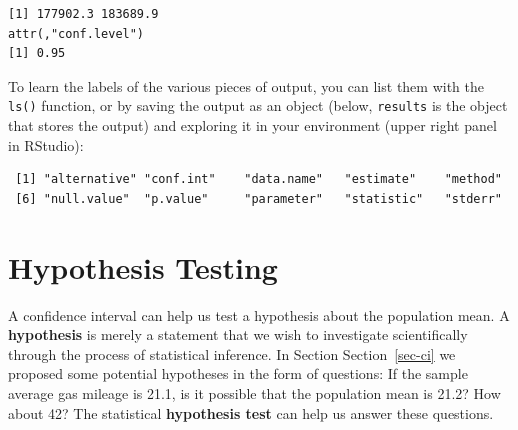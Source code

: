 \documentclass[
  letterpaper,
  DIV=11,
  numbers=noendperiod]{scrreprt}
\newenvironment{Shaded}{\begin{snugshade}}{\end{snugshade}}
\newcommand{\AttributeTok}[1]{\textcolor[rgb]{0.40,0.45,0.13}{#1}}
\newcommand{\FloatTok}[1]{\textcolor[rgb]{0.68,0.00,0.00}{#1}}
\newcommand{\FunctionTok}[1]{\textcolor[rgb]{0.28,0.35,0.67}{#1}}
\newcommand{\NormalTok}[1]{\textcolor[rgb]{0.00,0.23,0.31}{#1}}
\newcommand{\OtherTok}[1]{\textcolor[rgb]{0.00,0.23,0.31}{#1}}
\newcommand{\SpecialCharTok}[1]{\textcolor[rgb]{0.37,0.37,0.37}{#1}}
\begin{document}
\begin{verbatim}
[1] 177902.3 183689.9
attr(,"conf.level")
[1] 0.95
\end{verbatim}

To learn the labels of the various pieces of output, you can list them
with the \texttt{ls()} function, or by saving the output as an object
(below, \texttt{results} is the object that stores the output) and
exploring it in your environment (upper right panel in RStudio):

\begin{Shaded}
\end{Shaded}

\begin{verbatim}
 [1] "alternative" "conf.int"    "data.name"   "estimate"    "method"     
 [6] "null.value"  "p.value"     "parameter"   "statistic"   "stderr"     
\end{verbatim}

\begin{Shaded}
\end{Shaded}

\hypertarget{sec-hypotest}{%
\section{Hypothesis Testing}\label{sec-hypotest}}

A confidence interval can help us test a hypothesis about the population
mean. A \textbf{hypothesis} is merely a statement that we wish to
investigate scientifically through the process of statistical inference.
In Section Section~\ref{sec-ci} we proposed some potential hypotheses in
the form of questions: If the sample average gas mileage is 21.1, is it
possible that the population mean is 21.2? How about 42? The statistical
\textbf{hypothesis test} can help us answer these questions.
\end{document}
